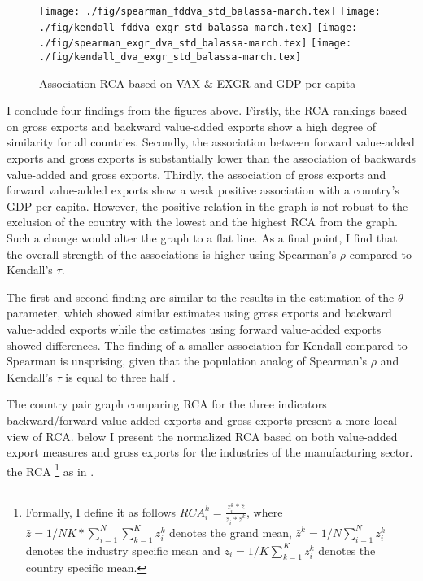 \begin{figure}[H]
\caption{Association RCA based on VAX \& EXGR and GDP per capita }
\centering
\texttt{[image: ./fig/spearman\_fddva\_std\_balassa-march.tex]}
\texttt{[image: ./fig/kendall\_fddva\_exgr\_std\_balassa-march.tex]}
\texttt{[image: ./fig/spearman\_exgr\_dva\_std\_balassa-march.tex]}
\texttt{[image: ./fig/kendall\_dva\_exgr\_std\_balassa-march.tex]}
\end{figure}
I conclude four findings from the figures above.
Firstly, the RCA rankings based on gross exports and backward value-added exports show a high degree of similarity for all countries.
Secondly, the association between forward value-added exports and gross exports is substantially lower than the association of backwards value-added and gross exports.
Thirdly,  the association of gross exports and forward value-added exports  show a weak positive association with a country's GDP per capita.
However, the positive relation in the graph is not robust to the exclusion of the country with the lowest and the highest RCA from the graph. Such a change would alter the graph to a flat line.
As a final point, I find that the overall strength of the associations is higher using  Spearman's $\rho$ compared to Kendall's $\tau$. \par
The first and second finding are similar to the results in the estimation of the $\theta$ parameter, which showed similar estimates using gross exports and backward value-added exports while the estimates using forward value-added exports showed differences.
The finding of a smaller association for Kendall compared to Spearman is unsprising, given that the population analog of Spearman's $\rho$ and Kendall's $\tau$ is equal to three half \parencite{fredricks2007}. \par
The country pair graph comparing RCA for the three indicators backward/forward value-added exports and gross exports present a more local view of RCA.
 below I present  the normalized RCA based on both value-added export measures and gross exports for the industries of the manufacturing sector.
the RCA \footnote{ Formally, I define it as follows $RCA_{i}^{k}=\frac{ z^k_i * \bar{z} }{\bar{z}_i * \bar{z}^k}$, where $\bar{z}=1/NK* \sum_{i=1}^N \sum_{k=1}^K z^k_i$ denotes the grand mean, $\bar{z}^k= 1/N \sum_{i=1}^N z^k_i$ denotes the industry specific mean and $\bar{z}_i= 1/K \sum_{k=1}^K z^k_i$ denotes the country specific mean.} as in \textcite{leromain2014}.
